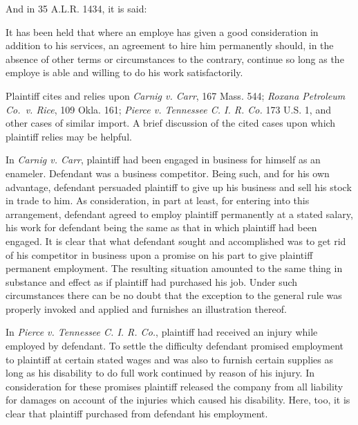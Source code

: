 \documentclass[
  letterpaper,
  11pt,
  DIV=9,
  openright]{scrbook}
\renewenvironment{quote}{
  \list{}{\leftmargin=2em\rightmargin=2em}
  \item\relax\small
}
{\endlist}
\begin{document}
And in 35 A.L.R. 1434, it is said:

\begin{quote}
It has been held that where an employe has given a good consideration in
addition to his services, an agreement to hire him permanently should,
in the absence of other terms or circumstances to the contrary, continue
so long as the employe is able and willing to do his work
satisfactorily.
\end{quote}

Plaintiff cites and relies upon \emph{Carnig v. Carr}, 167 Mass. 544;
\emph{Roxana Petroleum Co.~v. Rice}, 109 Okla. 161; \emph{Pierce v.
Tennessee C. I. R. Co.} 173 U.S. 1, and other cases of similar import. A
brief discussion of the cited cases upon which plaintiff relies may be
helpful.

In \emph{Carnig v. Carr}, plaintiff had been engaged in business for
himself as an enameler. Defendant was a business competitor. Being such,
and for his own advantage, defendant persuaded plaintiff to give up his
business and sell his stock in trade to him. As consideration, in part
at least, for entering into this arrangement, defendant agreed to employ
plaintiff permanently at a stated salary, his work for defendant being
the same as that in which plaintiff had been engaged. It is clear that
what defendant sought and accomplished was to get rid of his competitor
in business upon a promise on his part to give plaintiff permanent
employment. The resulting situation amounted to the same thing in
substance and effect as if plaintiff had purchased his job. Under such
circumstances there can be no doubt that the exception to the general
rule was properly invoked and applied and furnishes an illustration
thereof.

In \emph{Pierce v. Tennessee C. I. R. Co.}, plaintiff had received an
injury while employed by defendant. To settle the difficulty defendant
promised employment to plaintiff at certain stated wages and was also to
furnish certain supplies as long as his disability to do full work
continued by reason of his injury. In consideration for these promises
plaintiff released the company from all liability for damages on account
of the injuries which caused his disability. Here, too, it is clear that
plaintiff purchased from defendant his employment.
\end{document}
